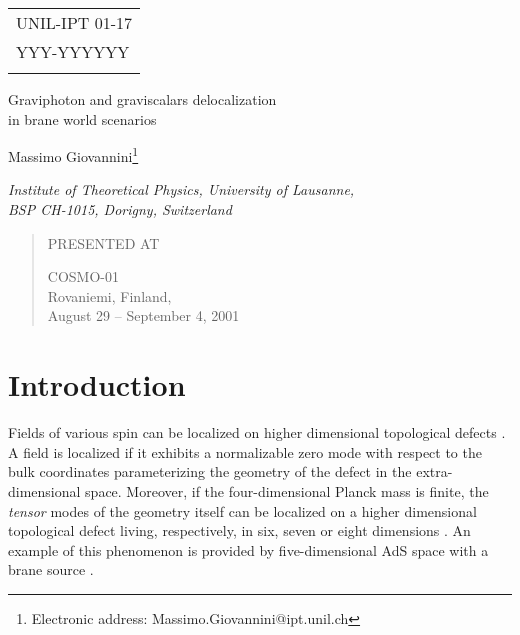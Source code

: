 \documentclass[a4paper,12pt]{article}
\newcommand{\pubdate}[1]{\begin{lrbox}{\sboxpubdate}{#1}\end{lrbox}}
\newcommand{\pubnumber}[1]{\begin{lrbox}{\sboxpubnumber}{\begin{tabular}{l}
#1 \\
				 \usebox{\sboxpubdate}
				 \end{tabular}}
                           \end{lrbox}
                           \pubblock}
\newcommand{\Title}[1]{\begin{center} {\Large #1 } \end{center}}
\newcommand{\Author}[1]{\begin{center}{ \sc #1} \end{center}}
\newcommand{\Address}[1]{\begin{center}{ \it #1} \end{center}}
\newcommand{\pubblock}{\rightline{
			\usebox{\sboxpubnumber}}}
\newenvironment{Presented}{\begin{quotation} \begin{center}
             PRESENTED AT\end{center}\bigskip
      \begin{center}\begin{large}}{\end{large}\end{center}
      \end{quotation}}
\begin{document}
\begin{titlepage}
\pubnumber{UNIL-IPT 01-17 \\ YYY-YYYYYY} %
\vfill
\Title{Graviphoton and graviscalars delocalization\\ in brane world
scenarios}
\vfill
\Author{Massimo Giovannini\footnote{Electronic address: 
Massimo.Giovannini@ipt.unil.ch}}
\Address{Institute of Theoretical Physics, University of Lausanne, \\
BSP CH-1015, Dorigny, Switzerland}
\vfill
\begin{abstract}
A manifestly gauge-invariant theory of gravitational fluctuations 
of brane-world scenarios is discussed. Without resorting 
to any specific gauge choice, a general method is presented 
in order to disentangle the fluctuations of the brane energy-momentum 
from the fluctuations of the metric.
As an application of the formalism, 
the localization  of metric fluctuations on scalar branes 
breaking spontaneously five-dimensional Poincar\'e invariance is addressed. 
Only assuming that the four-dimensional Planck mass is finite and that the
geometry is regular, it is demonstrated that the vector and scalar 
fluctuations of the metric are not localized on the brane. 
\end{abstract}
\begin{Presented}
    COSMO-01\\
    Rovaniemi, Finland, \\
    August 29 -- September 4, 2001
\end{Presented}
\vfill
\end{titlepage}
\def\thefootnote{\fnsymbol{footnote}}
\setcounter{footnote}{0}

\renewcommand{\theequation}{1.\arabic{equation}}
\setcounter{equation}{0}
\section{Introduction}
Fields of various spin can be localized \cite{m1} on higher dimensional 
topological defects \cite{m2,ak,vis}. A field is localized if 
it exhibits a normalizable zero mode with respect 
to the bulk coordinates parameterizing the geometry of 
the defect in the extra-dimensional space. 
Moreover, if the four-dimensional Planck mass is finite, the 
{\em tensor} modes of the geometry itself can be localized 
on a higher dimensional topological defect living, respectively, 
in six, seven or eight dimensions \cite{misproc}. An 
example of this phenomenon is provided 
by five-dimensional AdS space with a brane source \cite{rs,rs2}.
\end{document}
